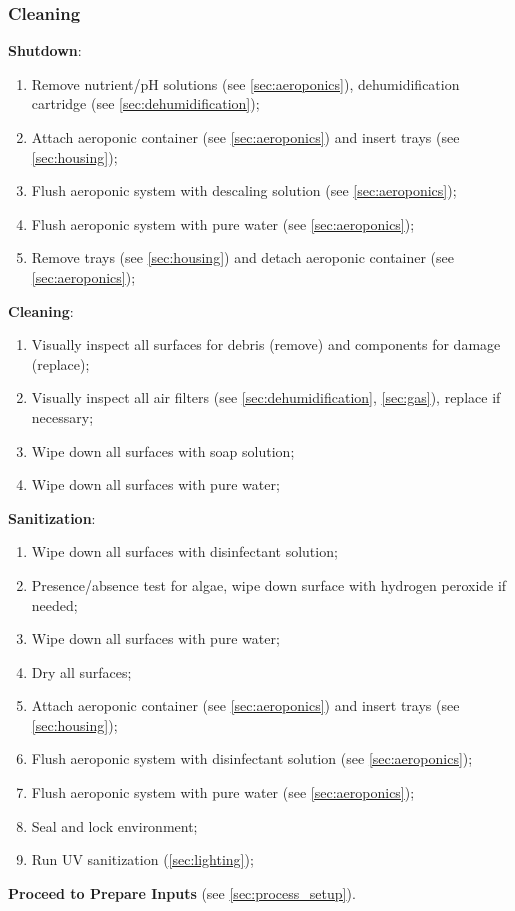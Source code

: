 \subsubsection{Cleaning}
\label{sec:process_cleaning}

\textbf{Shutdown}:
\begin{enumerate}
    \item Remove nutrient/pH solutions (see \ref{sec:aeroponics}), dehumidification cartridge (see \ref{sec:dehumidification});
    \item Attach aeroponic container (see \ref{sec:aeroponics}) and insert trays (see \ref{sec:housing});
    \item Flush aeroponic system with descaling solution (see \ref{sec:aeroponics});
    \item Flush aeroponic system with pure water (see \ref{sec:aeroponics});
    \item Remove trays (see \ref{sec:housing}) and detach aeroponic container (see \ref{sec:aeroponics});
\end{enumerate}

\textbf{Cleaning}:
\begin{enumerate}
    \item Visually inspect all surfaces for debris (remove) and components for damage (replace);
    \item Visually inspect all air filters (see \ref{sec:dehumidification}, \ref{sec:gas}), replace if necessary;
    \item Wipe down all surfaces with soap solution;
    \item Wipe down all surfaces with pure water;
\end{enumerate}

\textbf{Sanitization}:
\begin{enumerate}
    \item Wipe down all surfaces with disinfectant solution;
    \item Presence/absence test for algae, wipe down surface with hydrogen peroxide if needed;
    \item Wipe down all surfaces with pure water;
    \item Dry all surfaces;
    \item Attach aeroponic container (see \ref{sec:aeroponics}) and insert trays (see \ref{sec:housing});
    \item Flush aeroponic system with disinfectant solution (see \ref{sec:aeroponics});
    \item Flush aeroponic system with pure water (see \ref{sec:aeroponics});
    \item Seal and lock environment;
    \item Run UV sanitization (\ref{sec:lighting});
\end{enumerate}

\textbf{Proceed to Prepare Inputs} (see \ref{sec:process_setup}).